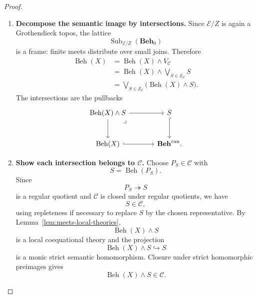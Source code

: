 \begin{proof}
\begin{enumerate}
        \item \textbf{Decompose the semantic image by intersections.}
        Since \(\mathcal E/Z\) is again a Grothendieck topos, the lattice
        \[
            \operatorname{Sub}_{\mathcal E/Z}(\mathbf{Beh}_0)
        \]
        is a frame: finite meets distribute over small joins. Therefore
        \[
        \begin{aligned}
            \operatorname{Beh}(X)
            &=
            \operatorname{Beh}(X)\wedge V_{\mathcal C} \\
            &=
            \operatorname{Beh}(X)\wedge
            \bigvee_{S\in\mathcal S_{\mathcal C}}S \\
            &=
            \bigvee_{S\in\mathcal S_{\mathcal C}}
            \bigl(\operatorname{Beh}(X)\wedge S\bigr).
        \end{aligned}
        \]
        The intersections are the pullbacks
        \[
        \begin{tikzcd}[column sep=large, row sep=large]
            \operatorname{Beh}(X)\wedge S
                \arrow[r]
                \arrow[d]
                \arrow[dr, phantom, "\lrcorner", very near start]
            &
            S
                \arrow[d, hook]
            \\
            \operatorname{Beh}(X)
                \arrow[r, hook]
            &
            \mathbf{Beh}^{\mathrm{can}} .
        \end{tikzcd}
        \]

        \item \textbf{Show each intersection belongs to \(\mathcal C\).}
        Choose \(P_S\in\mathcal C\) with
        \[
            S=\operatorname{Beh}(P_S).
        \]
        Since
        \[
            P_S\twoheadrightarrow S
        \]
        is a regular quotient and \(\mathcal C\) is closed under regular
        quotients, we have
        \[
            S\in\mathcal C,
        \]
        using repleteness if necessary to replace \(S\) by the chosen
        representative. By Lemma~\ref{lem:meets-local-theories},
        \[
            \operatorname{Beh}(X)\wedge S
        \]
        is a local coequational theory and the projection
        \[
            \operatorname{Beh}(X)\wedge S\hookrightarrow S
        \]
        is a monic strict semantic homomorphism. Closure under strict
        homomorphic preimages gives
        \[
            \operatorname{Beh}(X)\wedge S\in\mathcal C.
        \]


\end{enumerate}
\end{proof}
